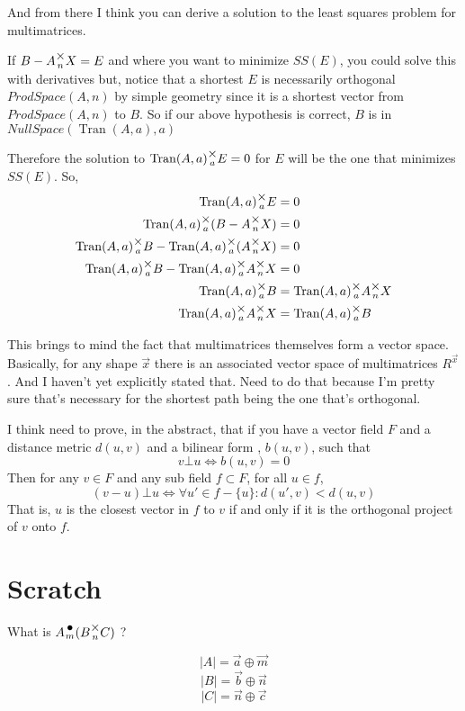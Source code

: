 \documentclass[12pt]{book}
\theoremstyle{plain}
\theoremstyle{definition}
\theoremstyle{ppart}
\theoremstyle{case}
\theoremstyle{solution}
\DeclareMathOperator{\Tran}{Tran}
\newcommand{\mmult}[1]{\text{\raisebox{1ex}{$\underset{#1}{\times}$}}}
\newcommand{\dmult}[1]{\text{\raisebox{1ex}{$\underset{#1}{\,\bullet\,}$}}}
\newcommand{\shape}[1]{\left|#1\right|}
\begin{document}
\begin{appendices}
And from there I think you can derive a solution to the least squares problem for multimatrices.

If $B - A \mmult{n} X = E$ and where you want to minimize $SS(E)$, you could solve this with derivatives
but, notice that a shortest $E$ is necessarily orthogonal $ProdSpace(A,n)$ by simple geometry since it is a shortest
vector from $ProdSpace(A,n)$ to $B$. So if our above hypothesis is correct, $B$ is in $NullSpace(\Tran(A,a), a)$

Therefore the solution to $\Tran(A,a) \mmult{a} E = 0$ for $E$ will be the one that minimizes $SS(E)$. So,
\begin{align*}
  \Tran(A,a) \mmult{a} E &= 0 \\
  \Tran(A,a) \mmult{a} (B - A \mmult{n} X) &= 0 \\
  \Tran(A,a) \mmult{a} B - \Tran(A,a) \mmult{a} (A \mmult{n} X) &= 0 \\
  \Tran(A,a) \mmult{a} B - \Tran(A,a) \mmult{a} A \mmult{n} X &= 0 \\
  \Tran(A,a) \mmult{a} B &= \Tran(A,a) \mmult{a} A \mmult{n} X \\
  \Tran(A,a) \mmult{a} A \mmult{n} X &= \Tran(A,a) \mmult{a} B
\end{align*}

This brings to mind the fact that multimatrices themselves form a vector space. Basically, for any shape $\vec{x}$
there is an associated vector space of multimatrices $R^{\vec{x}}$. And I haven't yet explicitly stated that. Need to do
that because I'm pretty sure that's necessary for the shortest path being the one that's orthogonal.

I think need to prove, in the abstract, that if you have a vector field $F$
and a distance metric $d(u,v)$ and a bilinear form \cite{wiki:bilinear}, $b(u,v)$, such that
\[ v \bot u \iff b(u,v) = 0 \]
Then for any $v \in F$ and any sub field $f \subset F$, for all $u \in f$,
\[ (v-u) \bot u \iff \forall u' \in f - \{u\} : d(u', v) < d(u,v) \]
That is, $u$ is the closest vector in $f$ to $v$ if and only if it is the orthogonal project of $v$ onto $f$.

\chapter{Scratch}

What is $A \dmult{m} (B \mmult{n} C)$ ?

\[ \shape{A} = \vec{a} \oplus \vec{m} \]
\[ \shape{B} = \vec{b} \oplus \vec{n} \]
\[ \shape{C} = \vec{n} \oplus \vec{c} \]


\end{appendices}
\end{document}
